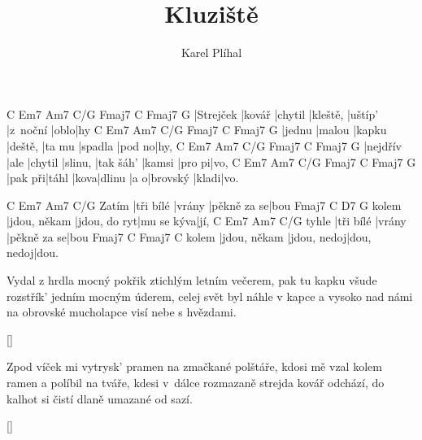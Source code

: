 \documentclass{song}
\author{Karel Plíhal}
\title{Kluziště}
\begin{document}
\strophe
C         Em7    Am7     C/G      Fmaj7   C        Fmaj7 G
|Strejček |kovář |chytil |kleště, |uštíp' |z~noční |oblo|hy
C      Em7    Am7    C/G     Fmaj7  C       Fmaj7 G
|jednu |malou |kapku |deště, |ta mu |spadla |pod no|hy,
C        Em7  Am7     C/G     Fmaj7     C      Fmaj7  G
|nejdřív |ale |chytil |slinu, |tak šáh' |kamsi |pro pi|vo,
C       Em7   Am7  C/G    Fmaj7 C      Fmaj7 G
|pak při|táhl |kova|dlinu |a o|brovský |kladi|vo.
\endstrophe

      C         Em7    Am7         C/G
Zatím |tři bílé |vrány |pěkně za se|bou
      Fmaj7        C            D7         G
kolem |jdou, někam |jdou, do ryt|mu se kýva|jí,
      C         Em7    Am7         C/G
tyhle |tři bílé |vrány |pěkně za se|bou
      Fmaj7        C           Fmaj7      C
kolem |jdou, někam |jdou, nedoj|dou, nedoj|dou.
\endstrophe

\strophe*
Vydal z hrdla mocný pokřik ztichlým letním večerem,
pak tu kapku všude rozstřík' jedním mocným úderem,
celej svět byl náhle v kapce a vysoko nad námi
na obrovské mucholapce visí nebe s hvězdami.
\endstrophe

\ref{}

\strophe*
Zpod víček mi vytrysk' pramen na zmačkané polštáře,
kdosi mě vzal kolem ramen a políbil na tváře,
kdesi v~dálce rozmazaně strejda kovář odchází,
do kalhot si čistí dlaně umazané od sazí.
\endstrophe

\ref{}
\end{document}
